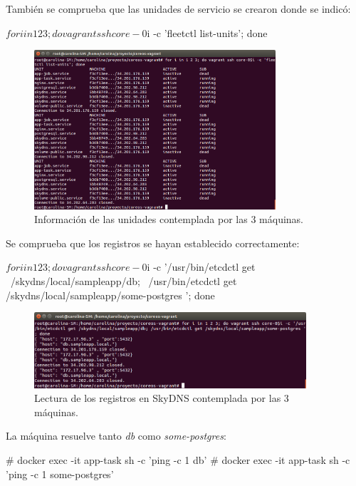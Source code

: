También se comprueba que las unidades de servicio se crearon donde se indicó:
\begin{code}
$ for i in 1 2 3; do vagrant ssh core-0$i -c 'fleetctl list-units'; done
\end{code}

\begin{figure}[H]
\centering
\includegraphics[width=0.8\textwidth]{images/figures/skydns-units.png}
\caption{Información de las unidades contemplada por las 3 máquinas.}
\end{figure}

Se comprueba que los registros se hayan establecido correctamente:

\begin{code}
$ for i in 1 2 3; do vagrant ssh core-0$i -c '/usr/bin/etcdctl get \
  /skydns/local/sampleapp/db; \
  /usr/bin/etcdctl get /skydns/local/sampleapp/some-postgres '; done
\end{code}

\begin{figure}[H]
\centering
\includegraphics[width=0.9\textwidth]{images/figures/skydns-gets.png}
\caption{Lectura de los registros en SkyDNS contemplada por las 3 máquinas.}
\end{figure}

La máquina  resuelve tanto \textit{db} como \textit{some-postgres}:

\begin{code}
# docker exec -it app-task sh -c 'ping -c 1 db'
# docker exec -it app-task sh -c 'ping -c 1 some-postgres'
\end{code}


